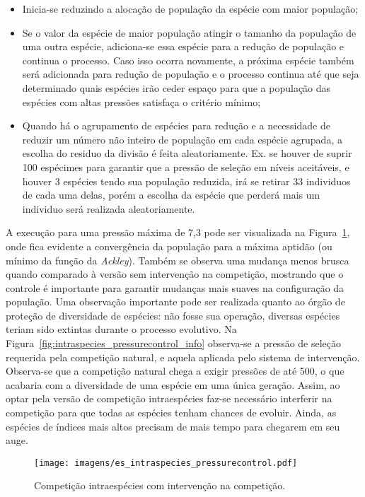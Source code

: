 \begin{itemize}
\item Inicia-se reduzindo a alocação de população da espécie com maior
população;
\item Se o valor da espécie de maior população atingir o tamanho da
população de uma outra espécie, adiciona-se essa espécie para a
redução de população e continua o processo. Caso isso ocorra
novamente, a próxima espécie também será adicionada para redução de
população e o processo continua até que seja determinado quais
espécies irão ceder espaço para que a população das espécies com altas
pressões satisfaça o critério mínimo;
\item Quando há o agrupamento de espécies para redução e a
necessidade de reduzir um número não inteiro de população em cada
espécie agrupada, a escolha do residuo da divisão é feita
aleatoriamente. Ex. se houver de suprir 100 espécimes para garantir que
a pressão de seleção em níveis aceitáveis, e houver 3 espécies tendo
sua população reduzida, irá se retirar 33 individuos de cada uma delas,
porém a escolha da espécie que perderá mais um individuo será
realizada aleatoriamente.
\end{itemize}

A execução para uma pressão máxima de 7,3 pode ser visualizada na
Figura~\ref{fig:intraspecies_pressurecontrol}, onde fica evidente a
convergência da população para a máxima aptidão (ou mínimo da função
da \emph{Ackley}). Também se observa uma mudança menos brusca quando
comparado à versão sem intervenção na competição, mostrando que o
controle é importante para garantir mudanças mais suaves na
configuração da população. Uma observação importante pode ser
realizada quanto ao órgão de proteção de diversidade de espécies: não
fosse sua operação, diversas espécies teriam sido extintas durante o
processo evolutivo. Na
Figura~\ref{fig:intraspecies_pressurecontrol_info} observa-se a
pressão de seleção requerida pela competição natural, e aquela
aplicada pelo sistema de intervenção. Observa-se que a competição
natural chega a exigir pressões de até 500, o que acabaria com a
diversidade de uma espécie em uma única geração. Assim, ao optar pela
versão de competição intraespécies faz-se necessário interferir na
competição para que todas as espécies tenham chances de evoluir.
Ainda, as espécies de índices mais altos precisam de mais tempo para
chegarem em seu auge.


\begin{figure}[h!t]
\centering
\texttt{[image: imagens/es\_intraspecies\_pressurecontrol.pdf]}
\caption[Competição intraespécies com intervenção na
competição.]{Competição intraespécies com intervenção na competição.}
\label{fig:intraspecies_pressurecontrol}
\end{figure}

